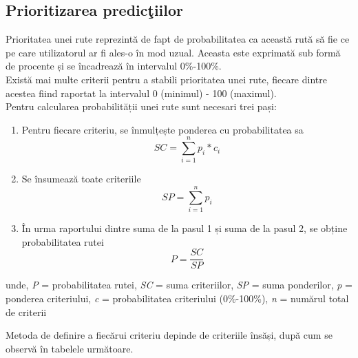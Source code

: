 		\subsection{Prioritizarea predicţiilor}
		Prioritatea unei rute reprezintă de fapt de probabilitatea ca această rută să fie ce pe care utilizatorul ar fi ales-o în mod uzual. Aceasta este exprimată sub formă de procente și se încadrează în intervalul 0\%-100\%.
		\vspace{6pt}
		\\Există mai multe criterii pentru a stabili prioritatea unei rute, fiecare dintre acestea fiind raportat la intervalul 0 (minimul) - 100 (maximul).  
		\vspace{6pt}
	    \\Pentru calcularea probabilității unei rute sunt necesari trei pași: 
	    
	    \begin{enumerate}
	     \setlength\itemsep{0em}
		 \item Pentru fiecare criteriu, se înmulțește ponderea cu probabilitatea sa 
		 \begin{equation}\label{qoat1}
		  SC = \sum_{i=1}^{n} p_{i}*c_{i}
		 \end{equation}
	     \item Se însumează toate criteriile  
		  \begin{equation}\label{qoat2}	      
	       SP = \sum_{i=1}^{n} p_{i}
	      \end{equation}
	     \item În urma raportului dintre suma de la pasul 1 și suma de la pasul 2, se obține probabilitatea rutei
	    \begin{equation}\label{qoat}	   
	     P = \frac{SC}{SP}
	    \end{equation}
    	\end{enumerate}
    	
		unde, \textit{P} = probabilitatea rutei, \textit{SC} = suma criteriilor, \textit{SP} = suma ponderilor, \textit{p} = ponderea criteriului, \textit{c} = probabilitatea criteriului (0\%-100\%), \textit{n} = numărul total de criterii	
		
		\vspace{6pt}
	    Metoda de definire a fiecărui criteriu depinde de criteriile însăși, după cum se observă în tabelele următoare.
		
